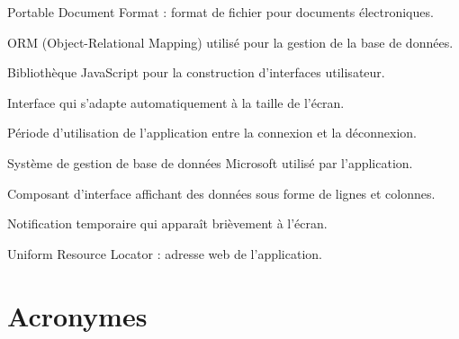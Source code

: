 \documentclass[12pt,a4paper]{report}
\begin{document}
\begin{description}[leftmargin=3cm, style=nextline]
    \item[PDF] Portable Document Format : format de fichier pour documents électroniques.
    
    \item[Prisma] ORM (Object-Relational Mapping) utilisé pour la gestion de la base de données.
    
    \item[React] Bibliothèque JavaScript pour la construction d'interfaces utilisateur.
    
    \item[Responsive] Interface qui s'adapte automatiquement à la taille de l'écran.
    
    \item[Session] Période d'utilisation de l'application entre la connexion et la déconnexion.
    
    \item[SQL Server] Système de gestion de base de données Microsoft utilisé par l'application.
    
    \item[Tableau] Composant d'interface affichant des données sous forme de lignes et colonnes.
    
    \item[Toast] Notification temporaire qui apparaît brièvement à l'écran.
    
    \item[URL] Uniform Resource Locator : adresse web de l'application.
\end{description}

\section{Acronymes}
\end{document}
